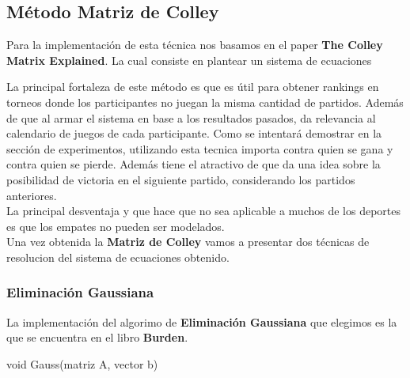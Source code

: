     

\subsection{Método Matriz de Colley}

Para la implementación de esta técnica nos basamos en el paper \textbf{The Colley Matrix Explained}. La cual consiste en plantear un sistema de ecuaciones

La principal fortaleza de este método es que es útil para obtener rankings en torneos donde los participantes no juegan la misma cantidad de partidos. Además de que al armar el sistema en base a los resultados pasados, da relevancia al calendario de juegos de cada participante. Como se intentará demostrar en la sección de experimentos, utilizando esta tecnica importa contra quien se gana y contra quien se pierde. Además tiene el atractivo de que da una idea sobre la posibilidad de victoria en el siguiente partido, considerando los partidos anteriores. \\

La principal desventaja y que hace que no sea aplicable a muchos de los deportes es que los empates no pueden ser modelados. \\

Una vez obtenida la \textbf{Matriz de Colley} vamos a  presentar dos técnicas de resolucion del sistema de ecuaciones obtenido. \\

\subsubsection{Eliminación Gaussiana}

La implementación del algorimo de \textbf{Eliminación Gaussiana} que elegimos es la que se encuentra en el libro \textbf{Burden}. \\


\begin{algorithm}
\begin{algorithmic}[1]\parskip=1mm
\caption{void Gauss(matriz A, vector b)}
\end{algorithmic}
\end{algorithm}


